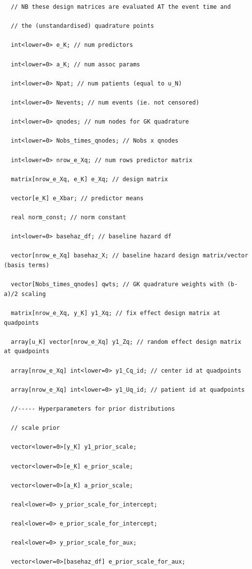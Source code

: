 \begin{SingleSpace}
\begin{verbatim}
  // NB these design matrices are evaluated AT the event time and

  // the (unstandardised) quadrature points

  int<lower=0> e_K; // num predictors 

  int<lower=0> a_K; // num assoc params

  int<lower=0> Npat; // num patients (equal to u_N)

  int<lower=0> Nevents; // num events (ie. not censored)

  int<lower=0> qnodes; // num nodes for GK quadrature

  int<lower=0> Nobs_times_qnodes; // Nobs x qnodes

  int<lower=0> nrow_e_Xq; // num rows predictor matrix

  matrix[nrow_e_Xq, e_K] e_Xq; // design matrix 

  vector[e_K] e_Xbar; // predictor means

  real norm_const; // norm constant

  int<lower=0> basehaz_df; // baseline hazard df

  vector[nrow_e_Xq] basehaz_X; // baseline hazard design matrix/vector (basis terms)

  vector[Nobs_times_qnodes] qwts; // GK quadrature weights with (b-a)/2 scaling

  matrix[nrow_e_Xq, y_K] y1_Xq; // fix effect design matrix at quadpoints

  array[u_K] vector[nrow_e_Xq] y1_Zq; // random effect design matrix at quadpoints

  array[nrow_e_Xq] int<lower=0> y1_Cq_id; // center id at quadpoints

  array[nrow_e_Xq] int<lower=0> y1_Uq_id; // patient id at quadpoints

  //----- Hyperparameters for prior distributions

  // scale prior

  vector<lower=0>[y_K] y1_prior_scale;

  vector<lower=0>[e_K] e_prior_scale;

  vector<lower=0>[a_K] a_prior_scale;

  real<lower=0> y_prior_scale_for_intercept;

  real<lower=0> e_prior_scale_for_intercept;

  real<lower=0> y_prior_scale_for_aux;

  vector<lower=0>[basehaz_df] e_prior_scale_for_aux;



\end{verbatim}
\end{SingleSpace}
